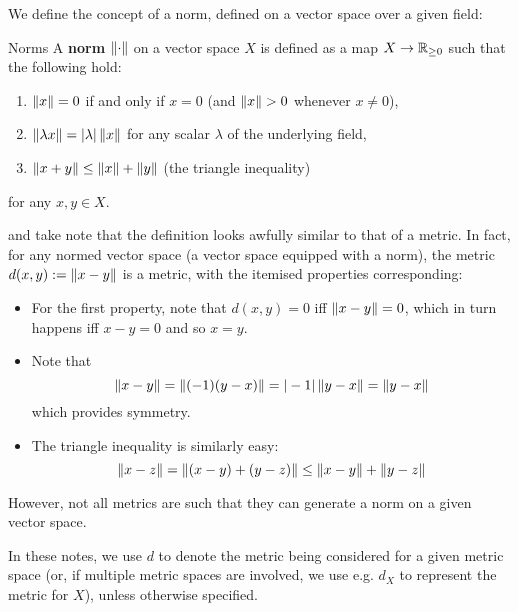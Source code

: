 We define the concept of a norm, defined on a vector space over a given field:
\begin{bdefin}{Norms}{}
A \textbf{norm} $\left\lVert \cdot \right\rVert$ on a vector space $X$ is defined as a map $ X \to \mathbb{R}_{\geq 0}$ such that the following hold:
\begin{enumerate}
    \item $\left\lVert x \right\rVert = 0$ if and only if $x=0$ (and $\left\lVert x \right\rVert>0$ whenever $x\neq 0$),
    \item $\left\lVert \lambda x \right\rVert = |\lambda| \left\lVert x \right\rVert$ for any scalar $\lambda$ of the underlying field,
    \item $\left\lVert x+y \right\rVert \leq \left\lVert x \right\rVert + \left\lVert y \right\rVert$ (the triangle inequality)
\end{enumerate}
for any $x,y \in X$.
\end{bdefin}
and take note that the definition looks awfully similar to that of a metric. In fact, for any normed vector space (a vector space equipped with a norm), the metric $d(x,y) := \left\lVert x-y \right\rVert$ is a metric, with the itemised properties corresponding:
\begin{itemize}
    \item For the first property, note that $d(x,y) = 0 $ iff $\left\lVert x-y \right\rVert = 0$, which in turn happens iff $x-y=0$ and so $x=y$.
    \item Note that \[ \left\lVert x-y \right\rVert = \left\lVert (-1)(y-x) \right\rVert = |-1| \left\lVert y-x \right\rVert = \left\lVert y-x \right\rVert \] which provides symmetry.
    \item The triangle inequality is similarly easy: \[ \left\lVert x-z \right\rVert = \left\lVert (x-y) + (y-z) \right\rVert \leq \left\lVert x-y \right\rVert + \left\lVert y-z \right\rVert \]
\end{itemize}
However, not all metrics are such that they can generate a norm on a given vector space.

In these notes, we use $d$ to denote the metric being considered for a given metric space (or, if multiple metric spaces are involved, we use e.g. $d_{X}$ to represent the metric for $X$), unless otherwise specified.

